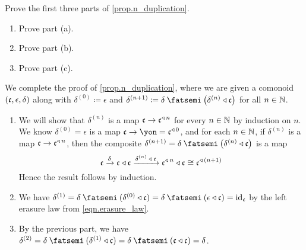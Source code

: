 \documentclass[Book-Poly]{subfiles}
\begin{document}
\begin{exercise} \label{exc.n_duplication}
Prove the first three parts of \cref{prop.n_duplication}. %
\begin{enumerate}
    \item Prove part (a).
    \item Prove part (b).
    \item Prove part (c).\qedhere
\end{enumerate}
\begin{solution}
We complete the proof of \cref{prop.n_duplication}, where we are given a comonoid $(\mathfrak{c},\epsilon,\delta)$ along with $\delta^{(0)}\coloneqq\epsilon$ and $\delta^{(n+1)}\coloneqq\delta\then\left(\delta^{(n)}\tri\ema{c}\right)$ for all $n\in\mathbb{N}$.
\begin{enumerate}
    \item We will show that $\delta^{(n)}$ is a map $\mathfrak{c}\to\mathfrak{c}^{\mathbin{\triangleleft}\,n}$ for every $n\in\mathbb{N}$ by induction on $n$.
    We know $\delta^{(0)}=\epsilon$ is a map $\ema{c}\to\yon=\ema{c}\tripow0$, and for each $n\in\mathbb{N}$, if $\delta^{(n)}$ is a map $\mathfrak{c}\to\mathfrak{c}^{\mathbin{\triangleleft}\,n}$, then the composite $\delta^{(n+1)}=\delta\then\left(\delta^{(n)}\tri\ema{c}\right)$ is a map
    \[
        \mathfrak{c}\xrightarrow{\delta}\mathfrak{c}\mathbin{\triangleleft}\mathfrak{c}\xrightarrow{\delta^{(n)}\:\mathbin{\triangleleft}\:\mathfrak{c}}\mathfrak{c}^{\mathbin{\triangleleft}\,n}\mathbin{\triangleleft}\mathfrak{c}\cong\mathfrak{c}^{\mathbin{\triangleleft}\,(n+1)}
    \]
    Hence the result follows by induction.
    
    \item We have $\delta^{(1)}=\delta\then(\delta^{(0)}\tri\ema{c})=\delta\then(\epsilon\tri\ema{c})=\id_\ema{c}$ by the left erasure law from \eqref{eqn.erasure_law}.
    
    \item By the previous part, we have $\delta^{(2)}=\delta\then(\delta^{(1)}\tri\ema{c})=\delta\then(\ema{c}\tri\ema{c})=\delta$.
\end{enumerate}
\end{solution}
\end{exercise}
\end{document}
